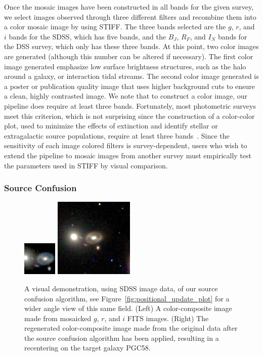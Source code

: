 \documentclass[authoryear, 12pt, 5p, times]{elsarticle}
\begin{document}
Once the mosaic images have been constructed in all bands for the given survey, we select images observed through three different filters and recombine them into a color mosaic image by using STIFF\label{sec:best_low}. The three bands selected are the $g$, $r$, and $i$ bands for the SDSS, which has five bands, and the $B_J$, $R_F$, and $I_N$ bands for the DSS survey, which only has these three bands. At this point, two color images are generated (although this number can be altered if necessary). The first color image generated emphasize low surface brightness structures, such as the halo around a galaxy, or interaction tidal streams. The second color image generated is a poster or publication quality image that uses higher background cuts to ensure a clean, highly contrasted image. We note that to construct a color image, our pipeline does require at least three bands. Fortunately, most photometric surveys meet this criterion, which is not surprising since the construction of a color-color plot, used to minimize the effects of extinction and identify stellar or extragalactic source populations, require at least three bands~\citep[see, e.g.,][]{2mass}. Since the sensitivity of each image  colored filters is survey-dependent, users who wish to extend the pipeline to mosaic images from another survey must empirically test the parameters used in STIFF by visual comparison.

\subsubsection{Source Confusion\label{sec:sc}}

\begin{figure}
\centering
  \includegraphics[width=.225\textwidth]{figures/PGC58b4SC}
  \includegraphics[width=.225\textwidth]{figures/PGC58afterSC}
\caption{ A visual demonstration, using SDSS image data, of our source confusion algorithm, see Figure~\ref{fig:positional_update_plot} for a wider angle view of this same field. (Left) A color-composite image made from mosaicked $g$, $r$, and $i$ FITS images. (Right) The regenerated color-composite image made from the original data after the source confusion algorithm has been applied, resulting in a recentering on the target galaxy PGC58.}
\label{fig:SCdemo}
\end{figure}
\end{document}
